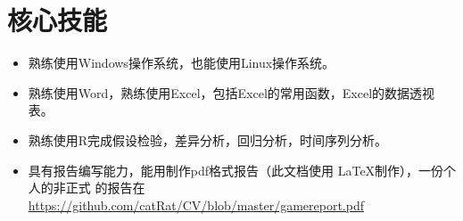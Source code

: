 \chapter{核心技能}
\begin{itemize}
	\item 熟练使用Windows操作系统，也能使用Linux操作系统。
	\item 熟练使用Word，熟练使用Excel，包括Excel的常用函数，Excel的数据透视表。
	\item 熟练使用R完成假设检验，差异分析，回归分析，时间序列分析。
	\item 具有报告编写能力，能用制作pdf格式报告（此文档使用 \LaTeX 制作），一份个人的非正式 
	的报告在\url{https://github.com/catRat/CV/blob/master/gamereport.pdf}
\end{itemize}

